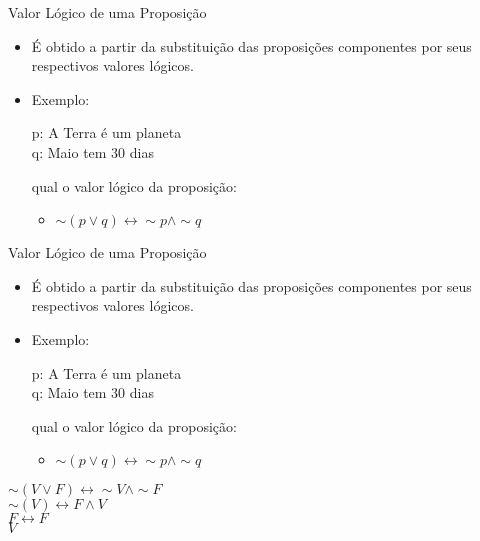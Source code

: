 \begin{frame}[t]{Valor Lógico de uma Proposição} %
	\begin{itemize}
	\item É obtido a partir da substituição das proposições componentes por seus respectivos valores lógicos.
	\item Exemplo:  

	\begin{center}p: A Terra é um planeta\\ q: Maio tem 30 dias\end{center}
	qual o valor lógico da proposição:

	\begin{itemize} \item $\sim (p \vee q) \leftrightarrow \sim p \wedge \sim q$ \end{itemize}
	\end{itemize}
\end{frame}

\begin{frame}[t]{Valor Lógico de uma Proposição} %
	\begin{itemize}
	\item É obtido a partir da substituição das proposições componentes por seus respectivos valores lógicos.
	\item Exemplo:  

	\begin{center}p: A Terra é um planeta\\ q: Maio tem 30 dias\end{center}
	qual o valor lógico da proposição:

	\begin{itemize} \item $\sim (p \vee q) \leftrightarrow \sim p \wedge \sim q$ \end{itemize}
	\end{itemize}
	
	\vskip 1cm

	\begin{center}
	$\sim (V \vee F) \leftrightarrow \sim V \wedge \sim F$ \\
	$\sim ( V ) \leftrightarrow F \wedge V$ \\
	$F \leftrightarrow F$ \\
	$V$
	\end{center}
\end{frame}

